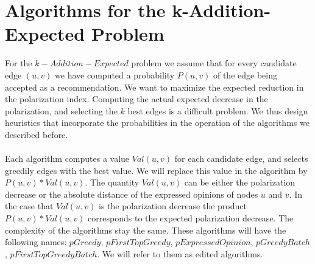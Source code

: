 \section{Algorithms for the k-Addition-Expected Problem}		
\label{sec:computingEdge}		
\vspace{20pt}
For the $k-Addition-Expected$ problem we assume that for every candidate edge $(u,v)$ we have computed a probability $P(u,v)$ of the edge being accepted as a recommendation. We want to maximize the expected reduction in the polarization index. Computing the actual expected decrease in the polarization, and selecting the $k$ best edges is a difficult problem. We thus design heuristics that incorporate the probabilities in the operation of the algorithms we described before.
\\
\\
Each algorithm computes a value $Val(u,v)$ for each candidate edge, and selects greedily edges with the best value. We will replace this value in the algorithm by $P(u,v)*Val(u,v)$. The quantity $Val(u,v)$ can be either the polarization decrease or the absolute distance of the expressed opinions of nodes $u$ and $v$. In the case that $Val(u,v)$ is the polarization decrease the product $P(u,v)*Val(u,v)$ corresponds to the expected polarization decrease. The complexity of the algorithms stay the same. These algorithms will have the following names: $pGreedy$, $pFirstTopGreedy$, $pExpressedOpinion$, $pGreedyBatch$, $pFirstTopGreedyBatch$. We will refer to them as edited algorithms.


\clearpage

